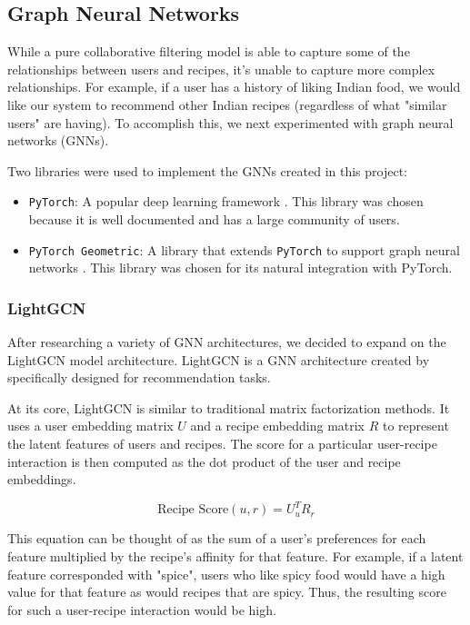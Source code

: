 \documentclass{article}
\begin{document}
\subsection{Graph Neural Networks}

While a pure collaborative filtering model is able to capture some of the relationships between users and recipes, it's unable to capture more complex relationships. For example, if a user has a history of liking Indian food, we would like our system to recommend other Indian recipes (regardless of what "similar users" are having). To accomplish this, we next experimented with graph neural networks (GNNs).

Two libraries were used to implement the GNNs created in this project:
\begin{itemize}
  \item \verb|PyTorch|: A popular deep learning framework \citep{pytorch}. This library was chosen because it is well documented and has a large community of users.
  \item \verb|PyTorch Geometric|: A library that extends \verb|PyTorch| to support graph neural networks \citep{pyg}. This library was chosen for its natural integration with PyTorch.
\end{itemize}

\subsubsection{LightGCN}

After researching a variety of GNN architectures, we decided to expand on the LightGCN model architecture. LightGCN is a GNN architecture created by \citet{lightgcn} specifically designed for recommendation tasks.

At its core, LightGCN is similar to traditional matrix factorization methods. It uses a user embedding matrix $U$ and a recipe embedding matrix $R$ to represent the latent features of users and recipes. The score for a particular user-recipe interaction is then computed as the dot product of the user and recipe embeddings.

$$
  \text{Recipe Score}(u, r) = U_u^TR_r
$$

This equation can be thought of as the sum of a user's preferences for each feature multiplied by the recipe's affinity for that feature. For example, if a latent feature corresponded with "spice", users who like spicy food would have a high value for that feature as would recipes that are spicy. Thus, the resulting score for such a user-recipe interaction would be high.
\end{document}
